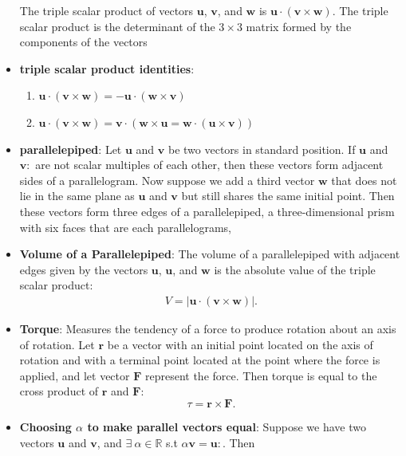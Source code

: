 \documentclass{report}
\begin{document}
\begin{itemize}
            The triple scalar product of vectors $\mathbf{u}$, $\mathbf{v}$, and $\mathbf{w}$ is $\mathbf{u} \cdot (\mathbf{v} \times \mathbf{w})$.
            \bigbreak \noindent 
            The triple scalar product is the determinant of the  $3\times 3$ matrix formed by the components of the vectors
        \item \textbf{triple scalar product identities}: 
            \begin{enumerate}[label=(\alph*)]
                \item $\mathbf{u} \cdot (\mathbf{v} \times \mathbf{w}) = -\mathbf{u} \cdot (\mathbf{w} \times \mathbf{v})$
                \item $\mathbf{u} \cdot (\mathbf{v} \times \mathbf{w}) = \mathbf{v} \cdot (\mathbf{w} \times \mathbf{u} = \mathbf{w} \cdot (\mathbf{u} \times \mathbf{v}))$
            \end{enumerate}
            \pagebreak 
        \item \textbf{parallelepiped}: Let $\mathbf{u}$ and $\mathbf{v}$ be two vectors in standard position. If $\mathbf{u}$ and $\mathbf{v}:$ are not scalar multiples of each other, then these vectors form adjacent sides of a parallelogram.
            \bigbreak \noindent 
            Now suppose we add a third vector  $\mathbf{w}$ that does not lie in the same plane as  $\mathbf{u}$ and  $\mathbf{v}$ but still shares the same initial point. Then these vectors form three edges of a parallelepiped, a three-dimensional prism with six faces that are each parallelograms,
        \item \textbf{Volume of a Parallelepiped}:
            The volume of a parallelepiped with adjacent edges given by the vectors  $\mathbf{u}$, $\mathbf{u}$, and $\mathbf{w}$ is the absolute value of the triple scalar product:
            \begin{align*}
                V = \bigg\lvert \mathbf{u} \cdot (\mathbf{v} \times \mathbf{w}) \bigg\rvert
            .\end{align*}
        \item \textbf{Torque}:
            Measures the tendency of a force to produce rotation about an axis of rotation. Let $\mathbf{r}$ be a vector with an initial point located on the axis of rotation and with a terminal point located at the point where the force is applied, and let vector $\mathbf{F}$ represent the force. Then torque is equal to the cross product of $\mathbf{r}$ and $\mathbf{F}$:
            $$
            \tau = \mathbf{r} \times \mathbf{F}.
            $$
        \item \textbf{Choosing $\alpha$ to make parallel vectors equal}: Suppose we have two vectors $\mathbf{u}$ and $\mathbf{v}$, and $\exists\ \alpha \in \mathbb{R}$ s.t $\alpha \mathbf{v} = \mathbf{u}:$. Then 

\end{itemize}
\end{document}
